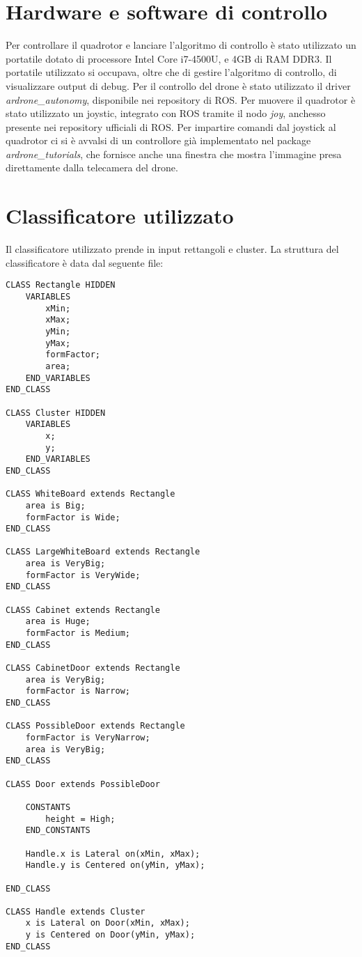 \section{Hardware e software di controllo}
Per controllare il quadrotor e lanciare l'algoritmo di controllo è stato utilizzato un portatile dotato di processore Intel Core i7-4500U, e 4GB di RAM DDR3.
Il portatile utilizzato si occupava, oltre che di gestire l'algoritmo di controllo, di visualizzare output di debug.
Per il controllo del drone è stato utilizzato il driver \textit{ardrone\_autonomy}, disponibile nei repository di ROS.
Per muovere il quadrotor è stato utilizzato un joystic, integrato con ROS tramite il nodo \textit{joy}, anchesso presente nei repository ufficiali di ROS.
Per impartire comandi dal joystick al quadrotor ci si è avvalsi di un controllore già implementato nel package  \textit{ardrone\_tutorials}, che fornisce anche una finestra che mostra l'immagine presa direttamente dalla telecamera del drone.

\section{Classificatore utilizzato}

Il classificatore utilizzato prende in input rettangoli e cluster.
La struttura del classificatore è data dal seguente file:

\begin{lstlisting}[language=fuzzyClassifier]
CLASS Rectangle HIDDEN
	VARIABLES
		xMin;
		xMax;
		yMin;
		yMax;
		formFactor;
		area;
	END_VARIABLES
END_CLASS

CLASS Cluster HIDDEN
	VARIABLES
		x;
		y;
	END_VARIABLES
END_CLASS

CLASS WhiteBoard extends Rectangle
	area is Big;
	formFactor is Wide;
END_CLASS

CLASS LargeWhiteBoard extends Rectangle
	area is VeryBig;
	formFactor is VeryWide;
END_CLASS

CLASS Cabinet extends Rectangle
	area is Huge;
	formFactor is Medium;
END_CLASS

CLASS CabinetDoor extends Rectangle
	area is VeryBig;
	formFactor is Narrow;
END_CLASS

CLASS PossibleDoor extends Rectangle
	formFactor is VeryNarrow;
	area is VeryBig;
END_CLASS

CLASS Door extends PossibleDoor
	
	CONSTANTS
		height = High;
	END_CONSTANTS
	
	Handle.x is Lateral on(xMin, xMax);
	Handle.y is Centered on(yMin, yMax);

END_CLASS

CLASS Handle extends Cluster	
	x is Lateral on Door(xMin, xMax);
	y is Centered on Door(yMin, yMax);
END_CLASS
\end{lstlisting}

